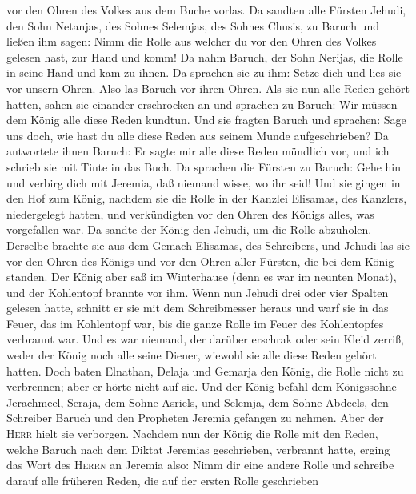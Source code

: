 vor den Ohren des Volkes aus dem Buche vorlas.  Da
sandten alle Fürsten Jehudi, den Sohn Netanjas, des Sohnes Selemjas, des
Sohnes Chusis, zu Baruch und ließen ihm sagen: Nimm die Rolle aus
welcher du vor den Ohren des Volkes gelesen hast, zur Hand und komm! Da
nahm Baruch, der Sohn Nerijas, die Rolle in seine Hand und kam zu ihnen.
 Da sprachen sie zu ihm: Setze dich und lies sie vor
unsern Ohren. Also las Baruch vor ihren Ohren.  Als sie
nun alle Reden gehört hatten, sahen sie einander erschrocken an und
sprachen zu Baruch: Wir müssen dem König alle diese Reden kundtun.
 Und sie fragten Baruch und sprachen: Sage uns doch, wie
hast du alle diese Reden aus seinem Munde aufgeschrieben?
 Da antwortete ihnen Baruch: Er sagte mir alle diese
Reden mündlich vor, und ich schrieb sie mit Tinte in das Buch.
 Da sprachen die Fürsten zu Baruch: Gehe hin und verbirg
dich mit Jeremia, daß niemand wisse, wo ihr seid!  Und
sie gingen in den Hof zum König, nachdem sie die Rolle in der Kanzlei
Elisamas, des Kanzlers, niedergelegt hatten, und verkündigten vor den
Ohren des Königs alles, was vorgefallen war.  Da sandte
der König den Jehudi, um die Rolle abzuholen. Derselbe brachte sie aus
dem Gemach Elisamas, des Schreibers, und Jehudi las sie vor den Ohren
des Königs und vor den Ohren aller Fürsten, die bei dem König standen.
 Der König aber saß im Winterhause (denn es war im
neunten Monat), und der Kohlentopf brannte vor ihm.  Wenn
nun Jehudi drei oder vier Spalten gelesen hatte, schnitt er sie mit dem
Schreibmesser heraus und warf sie in das Feuer, das im Kohlentopf war,
bis die ganze Rolle im Feuer des Kohlentopfes verbrannt war.
 Und es war niemand, der darüber erschrak oder sein Kleid
zerriß, weder der König noch alle seine Diener, wiewohl sie alle diese
Reden gehört hatten.  Doch baten Elnathan, Delaja und
Gemarja den König, die Rolle nicht zu verbrennen; aber er hörte nicht
auf sie.  Und der König befahl dem Königssohne
Jerachmeel, Seraja, dem Sohne Asriels, und Selemja, dem Sohne Abdeels,
den Schreiber Baruch und den Propheten Jeremia gefangen zu nehmen. Aber
der \textsc{Herr} hielt sie verborgen.  Nachdem nun der
König die Rolle mit den Reden, welche Baruch nach dem Diktat Jeremias
geschrieben, verbrannt hatte, erging das Wort des \textsc{Herrn} an
Jeremia also:  Nimm dir eine andere Rolle und schreibe
darauf alle früheren Reden, die auf der ersten Rolle geschrieben
